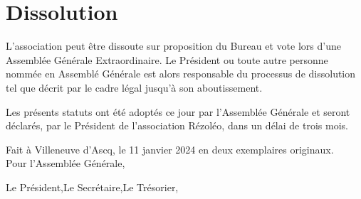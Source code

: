 \documentclass[12pt]{constitution}
\begin{document}
	\section{Dissolution}
	L'association peut être dissoute sur proposition du Bureau et vote lors d'une Assemblée Générale Extraordinaire.
	Le Président ou toute autre personne nommée en Assemblé Générale est alors responsable du processus de dissolution tel que décrit par le cadre légal jusqu'à son aboutissement.

	\newpage

	Les présents statuts ont été adoptés ce jour par l'Assemblée Générale et seront déclarés, par le Président de l'association Rézoléo, dans un délai de trois mois.
	\begin{flushright}
		Fait à Villeneuve d'Ascq, le 11 janvier 2024 en deux exemplaires originaux.\\
		Pour l'Assemblée Générale,
	\end{flushright}
	\noindent Le Président,\hfill  Le Secrétaire,\hfill  Le Trésorier, \\
\end{document}
